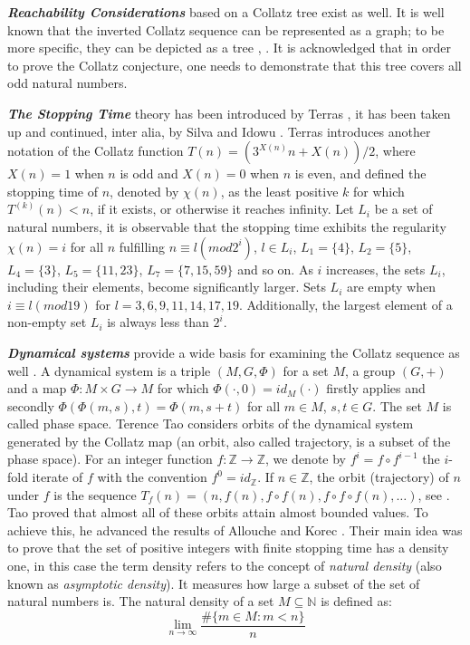 \par\medskip
\textit{\textbf{Reachability Considerations}} based on a Collatz tree exist as well. It is well known that the inverted Collatz sequence can be represented as a graph; to be more specific, they can be depicted as a tree \cite{Ref_Andrei_Masalagiu}, \cite{Ref_Kak_2014}. It is acknowledged that in order to prove the Collatz conjecture, one needs to demonstrate that this tree covers all odd natural numbers.

\par\medskip
\textit{\textbf{The Stopping Time}} theory has been introduced by Terras \cite{Ref_Terras_1976}, it has been taken up and continued, inter alia, by Silva \cite{Ref_Silva_1999} and Idowu \cite{Ref_Idowu_2015}. Terras introduces another notation of the Collatz function $T(n)=(3^{X(n)}n+X(n))/2$, where $X(n)=1$ when $n$ is odd and $X(n)=0$ when $n$ is even, and defined the stopping time of $n$, denoted by $\chi(n)$, as the least positive $k$ for which $T^{(k)}(n)<n$, if it exists, or otherwise it reaches infinity. Let $L_i$ be a set of natural numbers, it is observable that the stopping time exhibits the regularity $\chi(n)=i$ for all $n$ fulfilling $n\equiv l(mod 2^i)$, $l\in L_i$, $L_1=\{4\}$, $L_2=\{5\}$, $L_4=\{3\}$, $L_5=\{11,23\}$, $L_7=\{7,15,59\}$ and so on. As $i$ increases, the sets $L_i$, including their elements, become significantly larger. Sets $L_i$ are empty when $i\equiv l(mod 19)$ for $l=3,6,9,11,14,17,19$. Additionally, the largest element of a non-empty set $L_i$ is always less than $2^i$.

\par\medskip
\textit{\textbf{Dynamical systems}} provide a wide basis for examining the Collatz sequence as well \cite{Ref_Wirsching_1998}. A dynamical system \cite[p.~464]{Ref_Walz_2017} is a triple $(M,G,\Phi)$ for a set $M$, a group $(G,+)$ and a map $\Phi:M\times G\to M$ for which $\Phi(\cdot,0)=id_M(\cdot)$ firstly applies and secondly $\Phi\left(\Phi(m,s),t\right)=\Phi(m,s+t)$ for all $m\in M$, $s,t\in G$. The set $M$ is called phase space. Terence Tao \cite{Ref_Tao_2019} considers orbits of the dynamical system generated by the Collatz map (an orbit, also called trajectory, is a subset of the phase space). For an integer function $f:\mathbb{Z}\rightarrow\mathbb{Z}$, we denote by $f^i=f\circ f^{i-1}$ the $i$-fold iterate of $f$ with the convention $f^0=id_\mathbb{Z}$. If $n\in\mathbb{Z}$, the orbit (trajectory) of $n$ under $f$ is the sequence $T_f(n)=\left(n,f(n),f\circ f(n),f\circ f\circ f(n),\ldots\right)$, see \cite[p.~10]{Ref_Wirsching_1998}. Tao proved that almost all of these orbits attain almost bounded values. To achieve this, he advanced the results of Allouche \cite{Ref_Allouche_1978} and Korec \cite{Ref_Korec_1994}. Their main idea was to prove that the set of positive integers with finite stopping time has a density one, in this case the term density refers to the concept of \textit{natural density} (also known as \textit{asymptotic density}). It measures how large a subset of the set of natural numbers is. The natural density of a set $M\subseteq\mathbb{N}$ is defined as:
\[
\lim_{n\to\infty}\frac{\#\{m\in M:m<n\}}{n}
\]

